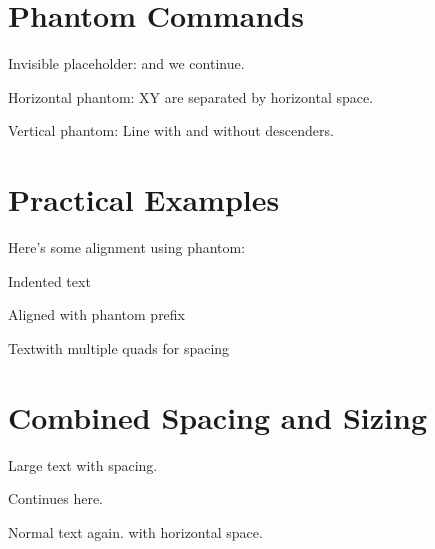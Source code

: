 \documentclass{article}
\begin{document}
\section{Phantom Commands}

Invisible placeholder: \phantom{This is hidden but takes space} and we continue.

Horizontal phantom: X\hphantom{hidden}Y are separated by horizontal space.

Vertical phantom: Line with \vphantom{descenders} and without descenders.

\section{Practical Examples}

Here's some alignment using phantom:

\hspace{3em}Indented text

\phantom{prefix}Aligned with phantom prefix

Text\quad\quad\quad with multiple quads for spacing

\section{Combined Spacing and Sizing}

\Large{
  Large text with spacing.
  
  \vspace{0.5cm}
  
  Continues here.
}

\normalsize{
  Normal text again.
  \hspace{2cm} with horizontal space.
}
\end{document}
